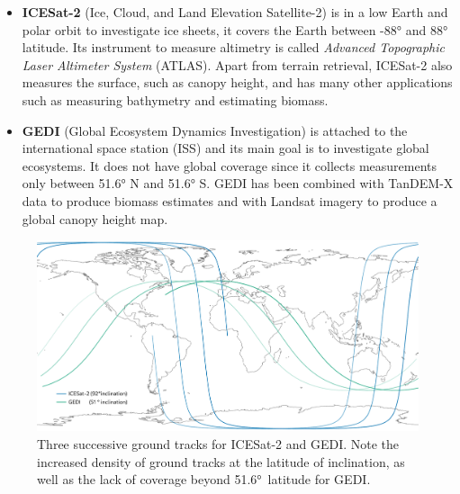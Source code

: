 \begin{itemize}
  \item \textbf{ICESat-2}
  (Ice, Cloud, and Land Elevation Satellite-2) is in a low Earth and polar orbit to investigate ice sheets, it covers the Earth between \ang{-88} and \ang{88} latitude.
  Its instrument to measure altimetry is called \emph{Advanced Topographic Laser Altimeter System} (ATLAS). 
  Apart from terrain retrieval, ICESat-2 also measures the surface, such as canopy height, and has many other applications such as measuring bathymetry and estimating biomass.
  \item \textbf{GEDI}
  (Global Ecosystem Dynamics Investigation) is attached to the international space station (ISS) and its main goal is to investigate global ecosystems.
  It does not have global coverage since it collects measurements only between \ang{51.6} N and \ang{51.6} S.
  GEDI has been combined with TanDEM-X data to produce biomass estimates and with Landsat imagery to produce a global canopy height map.
\end{itemize}
\begin{figure}
  \centering
  \includegraphics[width=\linewidth]{orbit}
  \caption{Three successive ground tracks for ICESat-2 and GEDI\@. Note the increased density of ground tracks at the latitude of inclination, as well as the lack of coverage beyond \ang{51.6}~latitude for GEDI.}%
\end{figure}

%

